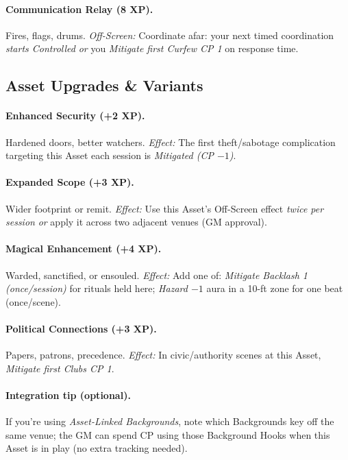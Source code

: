 \documentclass[11pt]{article}
\begin{document}
\paragraph{Communication Relay (8 XP).} Fires, flags, drums.
\emph{Off-Screen:} Coordinate afar: your next timed coordination \emph{starts Controlled} \emph{or} you \emph{Mitigate first Curfew CP 1} on response time.

\subsection*{Asset Upgrades \& Variants}
\paragraph{Enhanced Security (+2 XP).} Hardened doors, better watchers.
\emph{Effect:} The first theft/sabotage complication targeting this Asset each session is \emph{Mitigated (CP $-1$)}.

\paragraph{Expanded Scope (+3 XP).} Wider footprint or remit.
\emph{Effect:} Use this Asset’s Off-Screen effect \emph{twice per session} \emph{or} apply it across two adjacent venues (GM approval).

\paragraph{Magical Enhancement (+4 XP).} Warded, sanctified, or ensouled.
\emph{Effect:} Add one of: \emph{Mitigate Backlash 1 (once/session)} for rituals held here; \emph{Hazard $-1$} aura in a 10-ft zone for one beat (once/scene).

\paragraph{Political Connections (+3 XP).} Papers, patrons, precedence.
\emph{Effect:} In civic/authority scenes at this Asset, \emph{Mitigate first Clubs CP 1}.

\paragraph{Integration tip (optional).} If you’re using \emph{Asset-Linked Backgrounds}, note which Backgrounds key off the same venue; the GM can spend CP using those Background Hooks when this Asset is in play (no extra tracking needed).

\end{document}
